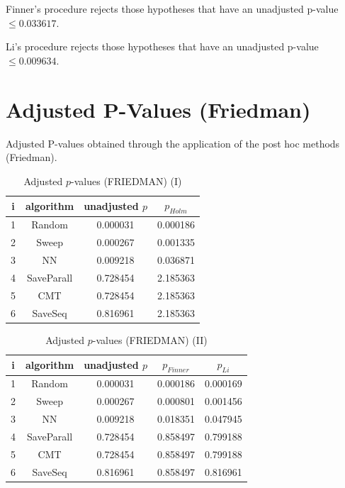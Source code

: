 \documentclass[a4paper,10pt]{article}
\begin{document}
\begin{landscape}
Finner's procedure rejects those hypotheses that have an unadjusted p-value $\le0.033617$.

Li's procedure rejects those hypotheses that have an unadjusted p-value $\le0.009634$.


\newpage

\section{Adjusted P-Values (Friedman)}


Adjusted P-values obtained through the application of the post hoc methods (Friedman).

\begin{table}[!htp]
\centering\small
\begin{tabular}{cccc}
i&algorithm&unadjusted $p$&$p_{Holm}$\\
\hline1&Random&0.000031&0.000186\\2&Sweep&0.000267&0.001335\\3&NN&0.009218&0.036871\\4&SaveParall&0.728454&2.185363\\5&CMT&0.728454&2.185363\\6&SaveSeq&0.816961&2.185363\\\hline
\end{tabular}
\caption{Adjusted $p$-values (FRIEDMAN) (I)}
\end{table}
\begin{table}[!htp]
\centering\small
\begin{tabular}{ccccc}
i&algorithm&unadjusted $p$&$p_{Finner}$&$p_{Li}$\\
\hline1&Random&0.000031&0.000186&0.000169\\2&Sweep&0.000267&0.000801&0.001456\\3&NN&0.009218&0.018351&0.047945\\4&SaveParall&0.728454&0.858497&0.799188\\5&CMT&0.728454&0.858497&0.799188\\6&SaveSeq&0.816961&0.858497&0.816961\\\hline
\end{tabular}
\caption{Adjusted $p$-values (FRIEDMAN) (II)}
\end{table}

\newpage
\end{landscape}
\end{document}
